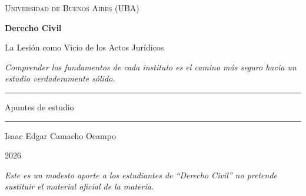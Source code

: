 \documentclass[12pt,oneside]{book}
\newcommand{\universidad}{Universidad de Buenos Aires (UBA)}
\newcommand{\materia}{Derecho Civil}
\newcommand{\titulo}{La Lesión como Vicio de los Actos Jurídicos}
\newcommand{\autor}{Isaac Edgar Camacho Ocampo}
\newcommand{\anio}{2026}
\begin{document}
\begin{titlepage}

\thispagestyle{empty}

\begin{center}

\vspace*{1cm}

{\large \textsc{\universidad}}

\vspace{3cm}

{\Huge \textbf{\materia}}

\vspace{1cm}

{\LARGE \titulo}

\vspace{0.8cm}

\textit{Comprender los fundamentos de cada instituto es el camino más seguro hacia un estudio verdaderamente sólido.}

\vspace{1.2cm}

\rule{0.70\textwidth}{0.5pt}

\vspace{0.5cm}

{\large Apuntes de estudio}

\vspace{0.5cm}

\rule{0.70\textwidth}{0.5pt}

\vfill

{\large \autor}

\vspace{0.3cm}

{\large \anio}

\end{center}

\vfill

\begin{flushleft}
\textit{Este es un modesto aporte a los estudiantes de ``Derecho Civil'' no pretende sustituir el material oficial de la materia.}
\end{flushleft}

\end{titlepage}

\tableofcontents

\end{document}
